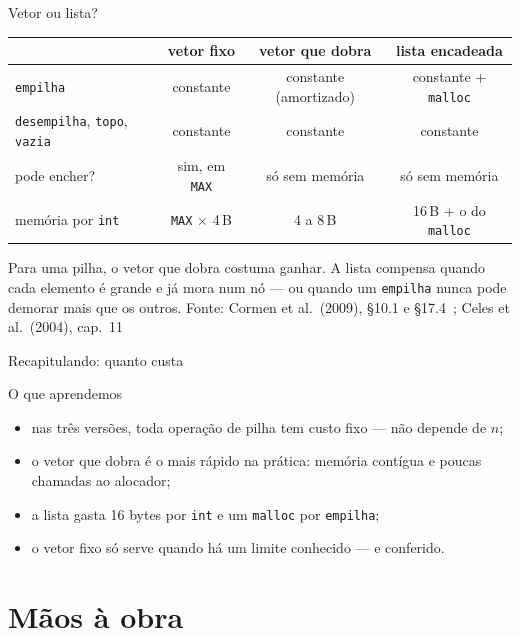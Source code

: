 \documentclass[aspectratio=169]{beamer}
\newcommand{\fonte}[1]{\vfill\hfill{\scriptsize\textcolor{UFSGray}{Fonte: #1}}}
\begin{document}
\begin{frame}{Vetor ou lista?}
  \begin{center}
  \small
  \begin{tabular}{@{}lccc@{}}
    \toprule
    & vetor fixo & vetor que dobra & lista encadeada\\
    \midrule
    \texttt{empilha}             & constante & constante (amortizado) & constante + \texttt{malloc}\\
    \texttt{desempilha}, \texttt{topo}, \texttt{vazia} & constante & constante & constante\\
    pode encher?                 & sim, em \texttt{MAX} & só sem memória & só sem memória\\
    memória por \texttt{int}     & \texttt{MAX} $\times$ 4\,B & 4 a 8\,B & 16\,B + o do \texttt{malloc}\\
    \bottomrule
  \end{tabular}
  \end{center}
  \small Para uma pilha, o vetor que dobra costuma ganhar. A lista compensa
  quando cada elemento é grande e já mora num nó --- ou quando um
  \texttt{empilha} nunca pode demorar mais que os outros.
  \fonte{Cormen et al.\ (2009), §10.1 e §17.4~\cite{cormen2009introduction};
    Celes et al.\ (2004), cap.~11~\cite{celes2004introducao}}
\end{frame}

\begin{frame}{Recapitulando: quanto custa}
  \begin{block}{O que aprendemos}
    \begin{itemize}
      \item nas três versões, toda operação de pilha tem custo fixo --- não
        depende de $n$;
      \item o vetor que dobra é o mais rápido na prática: memória contígua e
        poucas chamadas ao alocador;
      \item a lista gasta 16 bytes por \texttt{int} e um \texttt{malloc} por
        \texttt{empilha};
      \item o vetor fixo só serve quando há um limite conhecido --- e
        conferido.
    \end{itemize}
  \end{block}
\end{frame}

\section{Mãos à obra}
\end{document}
